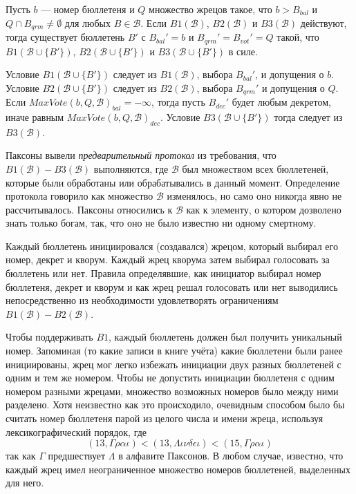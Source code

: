 \documentclass[12pt, a4paper]{article} %
\begin{document}
\begin{theorem}
Пусть $b$ --- номер бюллетеня и $Q$ множество жрецов такое, что $b > B_{bal}$ и $Q \cap B_{qrm} \neq \emptyset$ для любых $B \in \mathcal{B}$. Если $B1(\mathcal{B})$, $B2(\mathcal{B})$ и $B3(\mathcal{B})$ действуют, тогда существует бюллетень $B'$ с $B_{bal}' = b$ и $B_{qrm}' = B_{vot}' = Q$ такой, что $B1(\mathcal{B} \cup \{B'\})$, $B2(\mathcal{B} \cup \{B'\})$ и $B3(\mathcal{B} \cup \{B'\})$ в силе.
\end{theorem}
\begin{theoremproof}
Условие $B1(\mathcal{B} \cup \{B'\})$ следует из $B1(\mathcal{B})$, выбора $B_{bal}'$, и допущения о $b$. Условие  $B2(\mathcal{B} \cup \{B'\})$ следует из  $B2(\mathcal{B})$, выбора $B_{qrm}'$ и допущения о $Q$. Если $MaxVote(b, Q, \mathcal{B})_{bal} = - \infty$, тогда пусть $B_{dec}'$ будет любым декретом, иначе равным $MaxVote(b, Q, \mathcal{B})_{dec}$. Условие $B3(\mathcal{B} \cup \{B'\})$ тогда следует из $B3(\mathcal{B})$.
\end{theoremproof}

Паксоны вывели \textit{предварительный протокол} из требования, что $B1(\mathcal{B}) - B3(\mathcal{B})$ выполняются, где $\mathcal{B}$ был множеством всех бюллетеней, которые были обработаны или обрабатывались в данный момент. Определение протокола говорило как множество $\mathcal{B}$ изменялось, но само оно никогда явно не рассчитывалось. Паксоны относились к $\mathcal{B}$ как к элементу, о котором дозволено знать только богам, так, что оно не было известно ни одному смертному.

Каждый бюллетень инициировался (создавался) жрецом, который выбирал его номер, декрет и кворум. Каждый жрец кворума затем выбирал голосовать за бюллетень или нет. Правила определявшие, как инициатор выбирал номер бюллетеня, декрет и кворум и как жрец решал голосовать или нет выводились непосредственно из необходимости удовлетворять ограничениям $B1(\mathcal{B}) - B2(\mathcal{B})$.

Чтобы поддерживать $B1$, каждый бюллетень должен был получить уникальный номер. Запоминая (то какие записи в книге учёта) какие бюллетени были ранее инициированы, жрец мог легко избежать инициации двух разных бюллетеней с одним и тем же номером. Чтобы не допустить инициации бюллетеня с одним номером разными жрецами, множество возможных номеров было между ними разделено. Хотя неизвестно как это происходило, очевидным способом было бы считать номер бюллетеня парой из целого числа и имени жреца, используя лексикографический порядок, где
\[
    (13, \Gamma\rho\alpha\iota) < (13, \Lambda\iota\nu\delta\epsilon\iota) < (15, \Gamma\rho\alpha\iota)
\]
так как $\Gamma$ предшествует $\Lambda$ в алфавите Паксонов. В любом случае, известно, что каждый жрец имел неограниченное множество номеров бюллетеней, выделенных для него.
\end{document}
